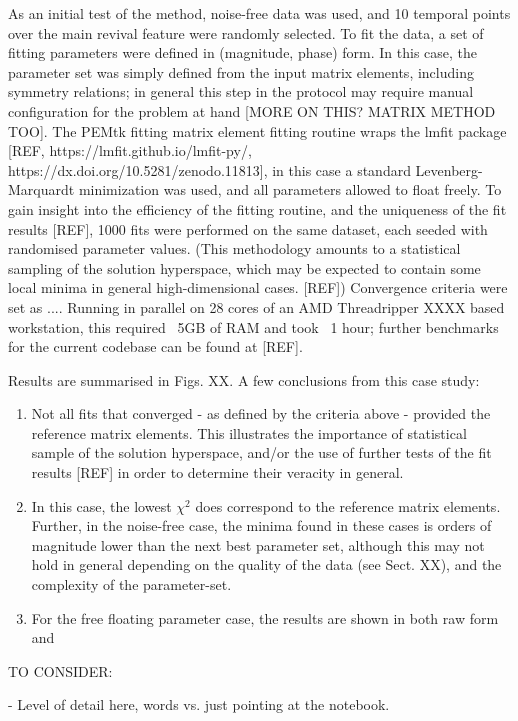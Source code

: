 As an initial test of the method, noise-free data was used, and 10 temporal points over the main revival feature were randomly selected. To fit the data, a set of fitting parameters were defined in (magnitude, phase) form. In this case, the parameter set was simply defined from the input matrix elements, including symmetry relations; in general this step in the protocol may require manual configuration for the problem at hand [MORE ON THIS? MATRIX METHOD TOO]. The PEMtk fitting matrix element fitting routine wraps the lmfit package [REF, https://lmfit.github.io/lmfit-py/, https://dx.doi.org/10.5281/zenodo.11813], in this case a standard Levenberg-Marquardt minimization was used, and all parameters allowed to float freely. To gain insight into the efficiency of the fitting routine, and the uniqueness of the fit results [REF], 1000 fits were performed on the same dataset, each seeded with randomised parameter values. (This methodology amounts to a statistical sampling of the solution hyperspace, which may be expected to contain some local minima in general high-dimensional cases. [REF]) Convergence criteria were set as .... Running in parallel on 28 cores of an AMD Threadripper XXXX based workstation, this required ~5GB of RAM and took ~1 hour; further benchmarks for the current codebase can be found at [REF].

Results are summarised in Figs. XX. A few conclusions from this case study:

\begin{enumerate}
\item Not all fits that converged - as defined by the criteria above - provided the reference matrix elements. This illustrates the importance of statistical sample of the solution hyperspace, and/or the use of further tests of the fit results [REF] in order to determine their veracity in general.
\item In this case, the lowest $\chi^2$ does correspond to the reference matrix elements. Further, in the noise-free case, the minima found in these cases is orders of magnitude lower than the next best parameter set, although this may not hold in general depending on the quality of the data (see Sect. XX), and the complexity of the parameter-set.
\item For the free floating parameter case, the results are shown in both raw form and 
\end{enumerate}

TO CONSIDER:

- Level of detail here, words vs. just pointing at the notebook.